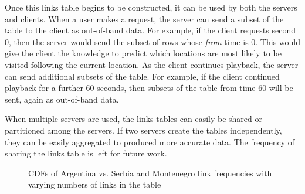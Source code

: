 Once this links table begins to be constructed, it can be used by both the servers and clients. When a user makes a request, the server can send a subset of the table to the client as out-of-band data. For example, if the client requests second 0, then the server would send the subset of rows whose \emph{from} time is 0. This would give the client the knowledge to predict which locations are most likely to be visited following the current location. As the client continues playback, the server can send additional subsets of the table. For example, if the client continued playback for a further 60 seconds, then subsets of the table from time 60 will be sent, again as out-of-band data.

When multiple servers are used, the links tables can easily be shared or partitioned among the servers. If two servers create the tables independently, they can be easily aggregated to produced more accurate data. The frequency of sharing the links table is left for future work.

\begin{figure}[t]
    \centering



    \caption{CDFs of Argentina vs. Serbia and Montenegro link frequencies with varying numbers of links in the table}
    \label{fig:link-freq}
\end{figure}

